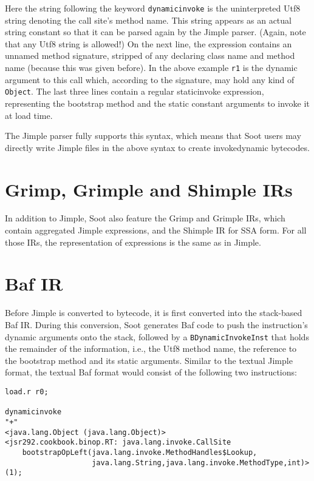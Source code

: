 \documentclass{article}
\begin{document}
Here the string following the keyword \texttt{dynamicinvoke} is the
uninterpreted Utf8 string denoting the call site's method name. This string
appears as an actual string constant so that it can be parsed again by the
Jimple parser. (Again, note that any Utf8 string is allowed!)
On the next line, the expression contains an unnamed method signature, stripped
of any declaring class name and method name (because this was given before). In
the above example \texttt{r1} is the dynamic argument to this call which,
according to the signature, may hold any kind of \texttt{Object}. The last three
lines contain a regular staticinvoke expression, representing the bootstrap
method and the static constant arguments to invoke it at load time.

The Jimple parser fully supports this syntax, which means that Soot users may
directly write Jimple files in the above syntax to create invokedynamic
bytecodes.

\section{Grimp, Grimple and Shimple IRs}
In addition to Jimple, Soot also feature the Grimp and Grimple IRs, which
contain aggregated Jimple expressions, and the Shimple IR for SSA form. For all
those IRs, the representation of expressions is the same as in Jimple.

\section{Baf IR}
Before Jimple is converted to bytecode, it is first converted into the
stack-based Baf IR. During this conversion, Soot generates Baf code to push the
instruction's dynamic arguments onto the stack, followed by a
\texttt{BDynamicInvokeInst} that holds the remainder of the information, i.e.,
the Utf8 method name, the reference to the bootstrap method and its static
arguments. Similar to the textual Jimple format, the textual Baf format would
consist of the following two instructions:

\begin{verbatim}
load.r r0;

dynamicinvoke
"+"
<java.lang.Object (java.lang.Object)>
<jsr292.cookbook.binop.RT: java.lang.invoke.CallSite
    bootstrapOpLeft(java.lang.invoke.MethodHandles$Lookup,
                    java.lang.String,java.lang.invoke.MethodType,int)>(1);
\end{verbatim}
\end{document}
